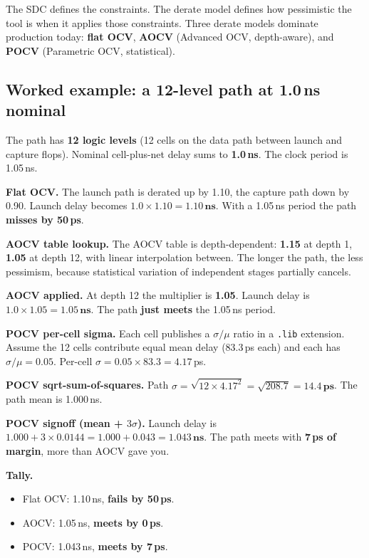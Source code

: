 The SDC defines the constraints. The derate model defines how pessimistic the tool is when it applies those constraints. Three derate models dominate production today: \textbf{flat OCV}, \textbf{AOCV} (Advanced OCV, depth-aware), and \textbf{POCV} (Parametric OCV, statistical).

\subsection{Worked example: a 12-level path at 1.0\,ns nominal}

The path has \textbf{12 logic levels} (12 cells on the data path between launch and capture flops). Nominal cell-plus-net delay sums to \textbf{1.0\,ns}. The clock period is 1.05\,ns.

 \textbf{Flat OCV.} The launch path is derated up by 1.10, the capture path down by 0.90. Launch delay becomes $1.0 \times 1.10 = \mathbf{1.10\,\text{ns}}$. With a 1.05\,ns period the path \textbf{misses by 50\,ps}.

 \textbf{AOCV table lookup.} The AOCV table is depth-dependent: \textbf{1.15} at depth 1, \textbf{1.05} at depth 12, with linear interpolation between. The longer the path, the less pessimism, because statistical variation of independent stages partially cancels.

 \textbf{AOCV applied.} At depth 12 the multiplier is \textbf{1.05}. Launch delay is $1.0 \times 1.05 = \mathbf{1.05\,\text{ns}}$. The path \textbf{just meets} the 1.05\,ns period.

 \textbf{POCV per-cell sigma.} Each cell publishes a $\sigma/\mu$ ratio in a \texttt{.lib} extension. Assume the 12 cells contribute equal mean delay (83.3\,ps each) and each has $\sigma/\mu = 0.05$. Per-cell $\sigma = 0.05 \times 83.3 = 4.17$\,ps.

 \textbf{POCV sqrt-sum-of-squares.} Path $\sigma = \sqrt{12 \times 4.17^2} = \sqrt{208.7} = \mathbf{14.4\,\text{ps}}$. The path mean is 1.000\,ns.

 \textbf{POCV signoff (mean + $3\sigma$).} Launch delay is $1.000 + 3 \times 0.0144 = 1.000 + 0.043 = \mathbf{1.043\,\text{ns}}$. The path meets with \textbf{7\,ps of margin}, more than AOCV gave you.

 \textbf{Tally.}
\begin{itemize}
  \item Flat OCV: 1.10\,ns, \textbf{fails by 50\,ps}.
  \item AOCV: 1.05\,ns, \textbf{meets by 0\,ps}.
  \item POCV: 1.043\,ns, \textbf{meets by 7\,ps}.
\end{itemize}

